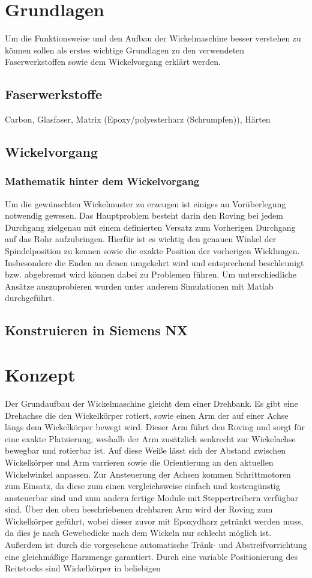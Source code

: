 \documentclass[12pt, a4paper, ngerman]{article}
\begin{document}
\section{Grundlagen}
Um die Funktionsweise und den Aufbau der Wickelmaschine besser verstehen zu können sollen als erstes wichtige Grundlagen zu den verwendeten Faserwerkstoffen sowie dem Wickelvorgang erklärt werden.

\subsection{Faserwerkstoffe}
Carbon, Glasfaser, Matrix (Epoxy/polyesterharz (Schrumpfen)), Härten

\subsection{Wickelvorgang}

\subsubsection{Mathematik hinter dem Wickelvorgang}
Um die gewünschten Wickelmuster zu erzeugen ist einiges an Vorüberlegung notwendig gewesen. Das Hauptproblem besteht darin den Roving bei jedem Durchgang zielgenau mit einem definierten Versatz zum Vorherigen Durchgang auf das Rohr aufzubringen. Hierfür ist es wichtig den genauen Winkel der Spindelposition zu kennen sowie die exakte Position der vorherigen Wicklungen. Insbesondere die Enden an denen umgekehrt wird und entsprechend beschleunigt bzw. abgebremst wird können dabei zu Problemen führen. Um unterschiedliche Ansätze auszuprobieren wurden unter anderem Simulationen mit Matlab durchgeführt.

\subsection{Konstruieren in Siemens NX}
    
\section{Konzept}
Der Grundaufbau der Wickelmaschine gleicht dem einer Drehbank. Es gibt eine Drehachse die den Wickelkörper rotiert, sowie einen Arm der auf einer Achse längs dem Wickelkörper bewegt wird. Dieser Arm führt den Roving und sorgt für eine exakte Platzierung, weshalb der Arm zusätzlich senkrecht zur Wickelachse bewegbar und rotierbar ist. Auf diese Weiße lässt sich der Abstand zwischen Wickelkörper und Arm varrieren sowie die Orientierung an den aktuellen Wickelwinkel anpassen. Zur Ansteuerung der Achsen kommen Schrittmotoren zum Einsatz, da diese zum einen vergleichsweise einfach und kostengünstig ansteuerbar sind und zum andern fertige Module mit Steppertreibern verfügbar sind. Über den oben beschriebenen drehbaren Arm wird der Roving zum Wickelkörper geführt, wobei dieser zuvor mit Epoxydharz getränkt werden muss, da dies je nach Gewebedicke nach dem Wickeln nur schlecht möglich ist. Außerdem ist durch die vorgesehene automatische Tränk- und Abstreifvorrichtung eine gleichmäßige Harzmenge garantiert. Durch eine variable Positionierung des Reitstocks sind Wickelkörper in beliebigen 
\end{document}

